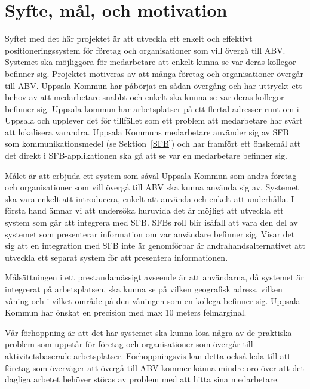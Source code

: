 \documentclass[a4paper,12pt]{article}
\begin{document}


 \section{Syfte, mål, och motivation}\label{syfte_mal_mot}
 Syftet med det här projektet är att utveckla ett enkelt och effektivt positioneringssystem för företag och organisationer som vill övergå till ABV. Systemet ska möjliggöra för medarbetare att enkelt kunna se var deras kollegor befinner sig. Projektet motiveras av att många företag och organisationer övergår till ABV. Uppsala Kommun har påbörjat en sådan övergång och har uttryckt ett behov av att medarbetare snabbt och enkelt ska kunna se var deras kollegor befinner sig. Uppsala kommun har arbetsplatser på ett flertal adresser runt om i Uppsala och upplever det för tillfället som ett problem att medarbetare har svårt att lokalisera varandra.
 Uppsala Kommuns medarbetare använder sig av SFB som kommunikationsmedel (se Sektion~\ref{SFB}) och har framfört ett önskemål att det direkt i SFB-applikationen ska gå att se var en medarbetare befinner sig.

 Målet är att erbjuda ett system som såväl Uppsala Kommun som andra företag och organisationer som vill övergå till ABV ska kunna använda sig av. Systemet ska vara enkelt att introducera, enkelt att använda och enkelt att underhålla.
 I första hand ämnar vi att undersöka huruvida det är möjligt att utveckla ett system som går att integrera med SFB. SFBs roll blir isåfall att vara den del av systemet som presenterar information om var användare befinner sig. Visar det sig att en integration med SFB inte är genomförbar är andrahandsalternativet att utveckla ett separat system för att presentera informationen.

 Målsättningen i ett prestandamässigt avseende är att användarna, då systemet är integrerat på arbetsplatsen, ska kunna se på vilken geografisk adress, vilken våning och i vilket område på den våningen som en kollega befinner sig. Uppsala Kommun har önskat en precision med max 10 meters felmarginal.

 Vår förhoppning är att det här systemet ska kunna lösa några av de praktiska problem som uppstår för företag och organisationer som övergår till aktivitetsbaserade arbetsplatser. Förhoppningsvis kan detta också leda till att företag som överväger att övergå till ABV kommer känna mindre oro över att det dagliga arbetet behöver störas av problem med att hitta sina medarbetare.
\end{document}
